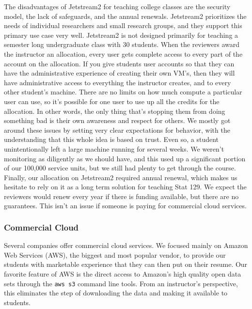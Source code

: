\documentclass[12pt]{article}
\begin{document}
The disadvantages of Jetstream2 for teaching college classes are the security model, the lack of safeguards, and the annual renewals.
Jetstream2 prioritizes the needs of individual researchers and small research groups, and they support this primary use case very well.
Jetstream2 is not designed primarily for teaching a semester long undergraduate class with 30 students.
When the reviewers award the instructor an allocation, every user gets complete access to every part of the account on the allocation.
If you give students user accounts so that they can have the administrative experience of creating their own VM's, then they will have administrative access to everything the instructor creates, and to every other student's machine.
There are no limits on how much compute a particular user can use, so it's possible for one user to use up all the credits for the allocation.
In other words, the only thing that's stopping them from doing something bad is their own awareness and respect for others.
We mostly got around these issues by setting very clear expectations for behavior, with the understanding that this whole idea is based on trust.
Even so, a student unintentionally left a large machine running for several weeks.
We weren't monitoring as diligently as we should have, and this used up a significant portion of our 100,000 service units, but we still had plenty to get through the course.
Finally, our allocation on Jetstream2 required annual renewal, which makes us hesitate to rely on it as a long term solution for teaching Stat 129.
We expect the reviewers would renew every year if there is funding available, but there are no guarantees.
This isn't an issue if someone is paying for commercial cloud services.


\subsubsection{Commercial Cloud}

Several companies offer commercial cloud services.
We focused mainly on Amazon Web Services (AWS), the biggest and most popular vendor, to provide our students with marketable experience that they can then put on their resume.
Our favorite feature of AWS is the direct access to Amazon's high quality open data sets through the \texttt{aws s3} command line tools.
From an instructor's perspective, this eliminates the step of downloading the data and making it available to students.
\end{document}
